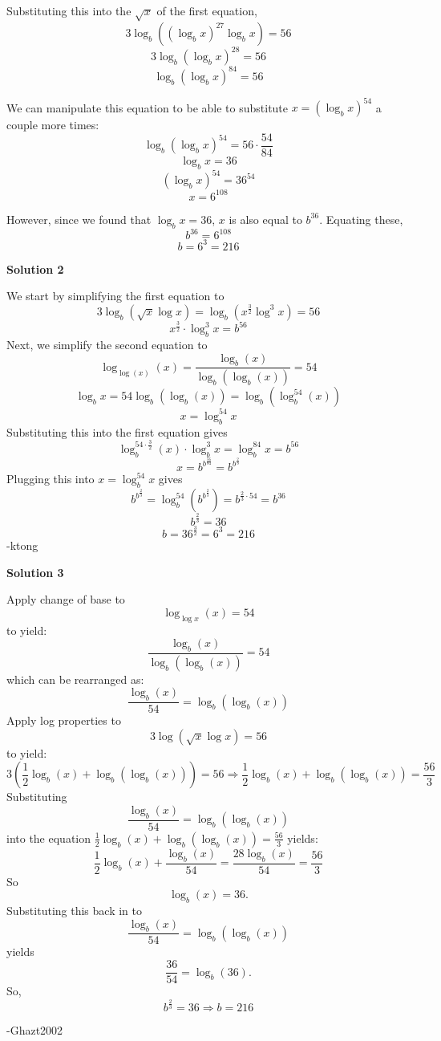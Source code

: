 \begin{enumerate}
 Substituting this into the $\sqrt x$ of the first equation,
 \[3\log_{b}{((\log_{b}{x})^{27}\log_{b}{x})} = 56\]
 \[3\log_{b}{(\log_{b}{x})^{28}} = 56\]
 \[\log_{b}{(\log_{b}{x})^{84}} = 56\]

 We can manipulate this equation to be able to substitute $x = (\log_{b}{x})^{54}$ a couple more times:
 \[\log_{b}{(\log_{b}{x})^{54}} = 56 \cdot \frac{54}{84}\]
 \[\log_{b}{x} = 36\]
 \[(\log_{b}{x})^{54} = 36^{54}\]
 \[x = 6^{108}\]

 However, since we found that $\log_{b}{x} = 36$, $x$ is also equal to $b^{36}$. Equating these,
 \[b^{36} = 6^{108}\]
 \[b = 6^3 = \boxed{216}\]




\textbf{Solution 2}

We start by simplifying the first equation to 
 \[3\log_{b}{(\sqrt{x}\log x)}=\log_{b}{(x^{\frac{3}{2}}\log^3x)}=56\]
 \[x^\frac{3}{2}\cdot \log_b^3x=b^{56}\]Next, we simplify the second equation to 
 \[\log_{\log(x)}(x)=\frac{\log_b(x)}{\log_b(\log_b(x))}=54\]
 \[\log_bx=54\log_b(\log_b(x))=\log_b(\log_b^{54}(x))\]
 \[x=\log_b^{54}x\]Substituting this into the first equation gives 
 \[\log_b^{54\cdot \frac{3}{2}}(x)\cdot \log_b^3x=\log_b^{84}x=b^{56}\]
 \[x=b^{b^{\frac{56}{84}}}=b^{b^{\frac{2}{3}}}\]Plugging this into $x=\log_b^{54}x$ gives 
 \[b^{b^{\frac{2}{3}}}=\log_b^{54}(b^{b^\frac{2}{3}})=b^{\frac{2}{3}\cdot 54}=b^{36}\]
 \[b^{\frac{2}{3}}=36\]
 \[b=36^{\frac{3}{2}}=6^3=\boxed{216}\]-ktong

 



\textbf{Solution 3}

Apply change of base to 
 \[\log_{\log x}(x)=54\] to yield: 
 \[\frac{\log_b(x)}{\log_b(\log_b(x))}=54\]which can be rearranged as:  
 \[\frac{\log_b(x)}{54}=\log_b(\log_b(x))\]Apply log properties to 
 \[3\log(\sqrt{x}\log x)=56\] to yield: 
 \[3(\frac{1}{2}\log_b(x)+\log_b(\log_b(x)))=56\Rightarrow\frac{1}{2}\log_b(x)+\log_b(\log_b(x))=\frac{56}{3}\]Substituting 
 \[\frac{\log_b(x)}{54}=\log_b(\log_b(x))\] into the equation $\frac{1}{2}\log_b(x)+\log_b(\log_b(x))=\frac{56}{3}$ yields: 
 \[\frac{1}{2}\log_b(x)+\frac{\log_b(x)}{54}=\frac{28\log_b(x)}{54}=\frac{56}{3}\]So 
 \[\log_b(x)=36.\]Substituting this back in to 
 \[\frac{\log_b(x)}{54}=\log_b(\log_b(x))\] yields
 \[\frac{36}{54}=\log_b(36).\]So,
 \[b^{\frac{2}{3}}=36\Rightarrow \boxed{b=216}\]

 -Ghazt2002

 




\end{enumerate}
